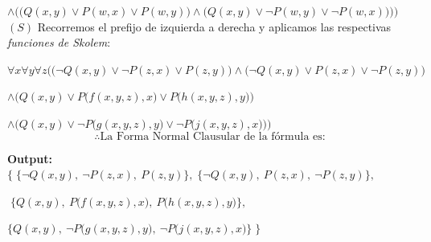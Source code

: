 \documentclass[12pt,letterpaper]{article}
\begin{document}
\begin{enumerate}
  \hspace{3cm} $\land \Big( \big(Q(x, y) \lor P(w,x) \lor P(w,y) \big) \land \big(Q(x,y) \lor \neg P(w,y) \lor \neg P(w,x)\big) \Big)\Bigg)$
  \\
  
  $(S)$ Recorremos el prefijo de izquierda a derecha y aplicamos las respectivas \textit{funciones de Skolem}:
  
  \quad {} $\forall x \forall y \forall z \bigg( \Big(\neg Q(x,y) \lor \neg P(z,x) \lor P(z,y) \Big) \land \Big(\neg Q(x,y) \lor P(z,x) \lor \neg P(z,y) \Big)$

  \hspace{3cm} $\land \Big(Q(x, y) \lor P \big(f(x, y, z), x \big) \lor P\big(h(x, y, z), y\big) \Big)$
  
  \hspace{3cm} $\land \Big(Q(x,y) \lor \neg P \big(g(x, y, z), y \big) \lor \neg P \big(j(x, y, z), x \big)\Big) \bigg)$
  \\

  \[
  \therefore \text{La Forma Normal Clausular de la f\'{o}rmula es:}
  \]

  \begin{center}
    \textbf{Output:} $\big \{ \; \{\neg Q(x,y),\: \neg P(z,x),\: P(z,y)\},\; \{ \neg Q(x,y),\: P(z,x),\: \neg P(z,y) \},$
    
    $\; \{ Q(x, y),\: P \big(f(x, y, z), x \big),\: P\big(h(x, y, z), y \big)\},$
    
    $\{Q(x,y),\: \neg P \big(g(x, y, z), y \big),\: \neg P \big(j(x, y, z), x \big)\} \; \big\}$
  \end{center}
  
  \bigskip

  \newpage
  

\end{enumerate}
\end{document}
